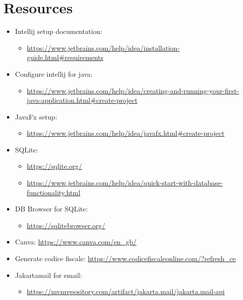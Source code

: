 \documentclass[10pt, titlepage]{article}
\begin{document}
    \section{Resources}
    \label{resources}
    \begin{itemize}
        \item Intellij setup documentation:
        \begin{itemize}
            \item \url{https://www.jetbrains.com/help/idea/installation-guide.html#requirements}
        \end{itemize}
        \item Configure intellij for java:
        \begin{itemize}
            \item \url{https://www.jetbrains.com/help/idea/creating-and-running-your-first-java-application.html#create-project}
        \end{itemize}
        \item JavaFx setup:
        \begin{itemize}
            \item \url{https://www.jetbrains.com/help/idea/javafx.html#create-project}
        \end{itemize}
        \item SQLite:
        \begin{itemize}
            \item \url{https://sqlite.org/}
            \item \url{https://www.jetbrains.com/help/idea/quick-start-with-database-functionality.html}
        \end{itemize}
        \item DB Browser for SQLite:
        \begin{itemize}
            \item \url{https://sqlitebrowser.org/}
        \end{itemize}
        \item Canva: \url{https://www.canva.com/en_gb/}
        \item Generate codice fiscale: \url{https://www.codicefiscaleonline.com/?refresh_ce}
        \item Jakartamail for email:
        \begin{itemize}
            \item \url{https://mvnrepository.com/artifact/jakarta.mail/jakarta.mail-api}
        \end{itemize}
    \end{itemize}   
\end{document}

